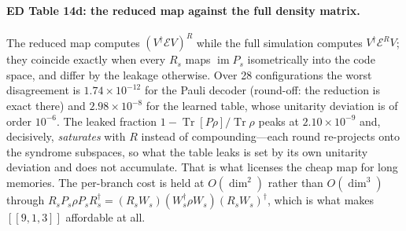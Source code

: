 \documentclass[10pt,a4paper]{article}
\begin{document}
\paragraph*{ED Table 14d: the reduced map against the full density matrix.}
The reduced map computes $(V^\dagger\mathcal{E}V)^R$ while the full simulation
computes $V^\dagger\mathcal{E}^RV$; they coincide exactly when every $R_s$ maps
$\operatorname{im}P_s$ isometrically into the code space, and differ by the
leakage otherwise.  Over 28 configurations the worst disagreement is $1.74\times 10^{-12}$ for the
Pauli decoder (round-off: the reduction is exact there) and $2.98\times 10^{-8}$ for the learned
table, whose unitarity deviation is of order $10^{-6}$.  The leaked fraction
$1-\operatorname{Tr}[P\rho]/\operatorname{Tr}\rho$ peaks at $2.10\times 10^{-9}$ and, decisively,
\emph{saturates} with $R$ instead of compounding---each round re-projects onto the
syndrome subspaces, so what the table leaks is set by its own unitarity deviation
and does not accumulate.  That is what licenses the cheap map for long memories.
The per-branch cost is held at $O(\dim^2)$ rather than $O(\dim^3)$ through
$R_sP_s\rho P_sR_s^\dagger=(R_sW_s)(W_s^\dagger\rho W_s)(R_sW_s)^\dagger$, which is
what makes $[\![9,1,3]\!]$ affordable at all.
\end{document}
